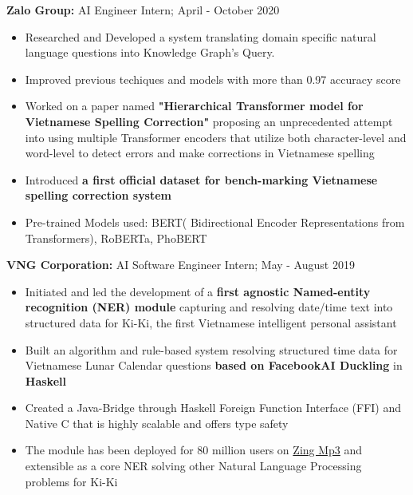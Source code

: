\documentclass[a4paper,11pt]{article}
\begin{document}
\begin{flushleft}
	
	\textbf{Zalo Group: } AI Engineer Intern; April - October 2020 \\
	\vspace{-\topsep}
	\begin{itemize}
		\setlength{\parskip}{2pt}
		\setlength{\itemsep}{0pt plus 1pt}
		\item Researched and Developed a system translating domain specific natural language questions into Knowledge Graph's Query.
		\item Improved previous techiques and models with more than 0.97 accuracy score                                                       
		\item Worked on a paper named \textbf{"Hierarchical Transformer model for Vietnamese Spelling Correction"} proposing an unprecedented attempt into using multiple Transformer encoders that utilize both character-level and word-level to detect errors and make corrections in Vietnamese spelling 
		\item Introduced \textbf{a first official dataset for bench-marking Vietnamese spelling correction system}
		\item Pre-trained Models used: BERT( Bidirectional Encoder Representations from Transformers),  RoBERTa, PhoBERT
	\end{itemize}
	\vspace{-\topsep}

\end{flushleft} 

\begin{flushleft}

	\textbf{VNG Corporation: } AI Software Engineer Intern; May - August 2019 \\
	\vspace{-\topsep}
	\begin{itemize}
		\setlength{\parskip}{2pt}
		\setlength{\itemsep}{0pt plus 1pt}
		\item Initiated and led the development of a \textbf{first agnostic Named-entity recognition (NER) module} capturing and resolving date/time text into structured data for Ki-Ki, the first Vietnamese intelligent personal assistant
		\item Built an algorithm and rule-based system resolving structured time data for Vietnamese Lunar Calendar questions \textbf{based on FacebookAI Duckling} in \textbf{Haskell} 
		\item Created a Java-Bridge through Haskell Foreign Function Interface (FFI) and Native C that is highly scalable and offers type safety
		\item  The module has been deployed for 80 million users on \href{https://mp3.zing.vn/}{Zing Mp3} and extensible as a core NER solving other Natural Language Processing problems for Ki-Ki
	\end{itemize}
\vspace{-\topsep}
\centering{\noindent\makebox{\rule{8cm}{1.5pt}}}
\end{flushleft} 
\end{document}

